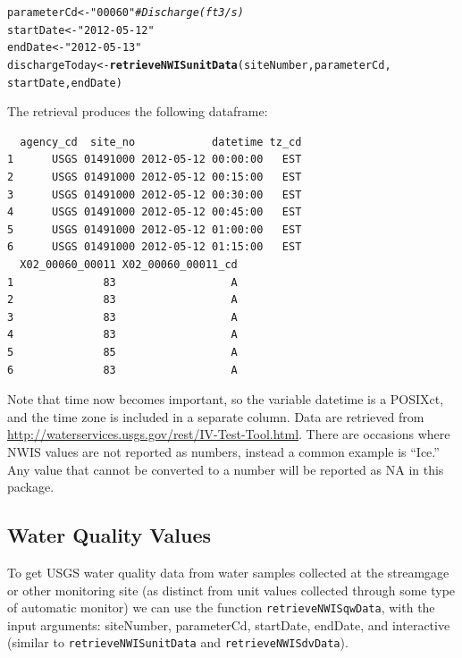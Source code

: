 \documentclass[a4paper,11pt]{article}\usepackage[]{graphicx}\usepackage[]{color}
\makeatletter
\newcommand{\hlstr}[1]{\textcolor[rgb]{0.192,0.494,0.8}{#1}}%
\newcommand{\hlcom}[1]{\textcolor[rgb]{0.678,0.584,0.686}{\textit{#1}}}%
\newcommand{\hlstd}[1]{\textcolor[rgb]{0.345,0.345,0.345}{#1}}%
\newcommand{\hlkwb}[1]{\textcolor[rgb]{0.69,0.353,0.396}{#1}}%
\newcommand{\hlkwd}[1]{\textcolor[rgb]{0.737,0.353,0.396}{\textbf{#1}}}%
\newenvironment{kframe}{%
 \def\at@end@of@kframe{}%
 \ifinner\ifhmode%
  \def\at@end@of@kframe{\end{minipage}}%
  \begin{minipage}{\columnwidth}%
 \fi\fi%
 \def\FrameCommand##1{\hskip\@totalleftmargin \hskip-\fboxsep
 \colorbox{shadecolor}{##1}\hskip-\fboxsep
     \hskip-\linewidth \hskip-\@totalleftmargin \hskip\columnwidth}%
 \MakeFramed {\advance\hsize-\width
   \@totalleftmargin\z@ \linewidth\hsize
   \@setminipage}}%
 {\par\unskip\endMakeFramed%
 \at@end@of@kframe}
\newenvironment{knitrout}{}{} %
\makeatother
\begin{document}
\begin{knitrout}
\color{fgcolor}\begin{kframe}
\begin{alltt}
\hlstd{parameterCd} \hlkwb{<-} \hlstr{"00060"}  \hlcom{# Discharge (ft3/s)}
\hlstd{startDate} \hlkwb{<-} \hlstr{"2012-05-12"}
\hlstd{endDate} \hlkwb{<-} \hlstr{"2012-05-13"}
\hlstd{dischargeToday} \hlkwb{<-} \hlkwd{retrieveNWISunitData}\hlstd{(siteNumber, parameterCd,}
        \hlstd{startDate, endDate)}
\end{alltt}
\end{kframe}
\end{knitrout}

The retrieval produces the following dataframe:

\begin{knitrout}
\color{fgcolor}\begin{kframe}
\begin{verbatim}
  agency_cd  site_no            datetime tz_cd
1      USGS 01491000 2012-05-12 00:00:00   EST
2      USGS 01491000 2012-05-12 00:15:00   EST
3      USGS 01491000 2012-05-12 00:30:00   EST
4      USGS 01491000 2012-05-12 00:45:00   EST
5      USGS 01491000 2012-05-12 01:00:00   EST
6      USGS 01491000 2012-05-12 01:15:00   EST
  X02_00060_00011 X02_00060_00011_cd
1              83                  A
2              83                  A
3              83                  A
4              83                  A
5              85                  A
6              83                  A
\end{verbatim}
\end{kframe}
\end{knitrout}

Note that time now becomes important, so the variable datetime is a POSIXct, and the time zone is included in a separate column. Data are retrieved from \url{http://waterservices.usgs.gov/rest/IV-Test-Tool.html}. There are occasions where NWIS values are not reported as numbers, instead a common example is \enquote{Ice.}  Any value that cannot be converted to a number will be reported as NA in this package.

\newpage


\FloatBarrier

\subsection{Water Quality Values}
\label{sec:usgsWQP}
To get USGS water quality data from water samples collected at the streamgage or other monitoring site (as distinct from unit values collected through some type of automatic monitor) we can use the function \texttt{retrieveNWISqwData}, with the input arguments: siteNumber, parameterCd, startDate, endDate, and interactive (similar to \texttt{retrieveNWISunitData} and \texttt{retrieveNWISdvData}).
\end{document}
